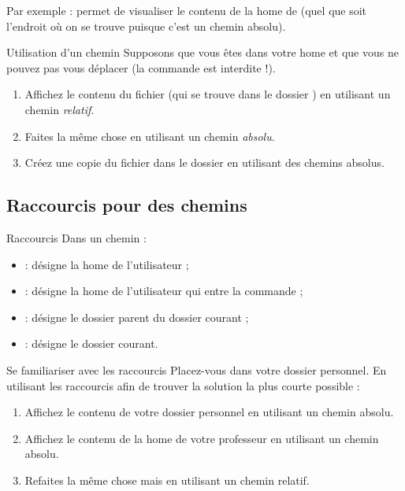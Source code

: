 \documentclass[a4paper,11pt]{style-esi/td}
\begin{document}
		Par exemple : 
		permet de visualiser le contenu de la home de 
		(quel que soit l'endroit où on se trouve puisque c'est un chemin absolu).
		
		\begin{Exercice}{Utilisation d'un chemin}
			Supposons que vous êtes dans votre home 
			et que vous ne pouvez pas vous déplacer 
			(la commande  est interdite !).
			\begin{enumerate}
			\item 
				Affichez le contenu du fichier 
				(qui se trouve dans le dossier )
				en utilisant un chemin \emph{relatif}.
			\item 
				Faites la même chose 
				en utilisant un chemin \emph{absolu}.
			\item
				Créez une copie du fichier  
				dans le dossier 
				en utilisant des chemins absolus.
			\end{enumerate}
		\end{Exercice}

	\subsection{Raccourcis pour des chemins}

		\begin{theorie}{Raccourcis}
			Dans un chemin :
			\begin{itemize}
			\item {} : désigne la home de l'utilisateur  ;
			\item \samp{\textasciitilde{}} : désigne la home de l'utilisateur qui entre la commande ;
			\item {} : désigne le dossier parent du dossier courant ;
			\item {} : désigne le dossier courant.
			\end{itemize}
		\end{theorie}

		\begin{Exercice}{Se familiariser avec les raccourcis}
			Placez-vous dans votre dossier personnel.
			En utilisant les raccourcis 
			afin de trouver la solution la plus courte possible :
			\begin{enumerate}
			\item Affichez le contenu de votre dossier personnel
				en utilisant un chemin absolu.
			\item Affichez le contenu de la home de votre professeur
				en utilisant un chemin absolu.
			\item Refaites la même chose mais en utilisant un chemin relatif.
			\end{enumerate}
		\end{Exercice}
\end{document}
